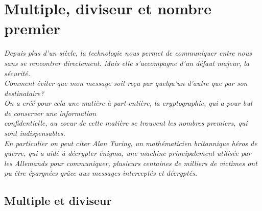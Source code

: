 \documentclass[french]{book}
\begin{document}
\begin{center}
\end{center}


\chapter{Multiple, diviseur et nombre premier}

\textit{Depuis plus d'un siècle, la technologie nous permet de communiquer entre nous sans se rencontrer directement. Mais elle s'accompagne d'un défaut majeur, la sécurité.
\\
 Comment éviter que mon message soit reçu par quelqu'un d'autre que par son destinataire? \\
On a créé pour cela une matière à part entière, la cryptographie, qui a pour but de conserver une information\\ 
\vspace{2mm} confidentielle, au coeur de cette matière se trouvent les nombres premiers, qui sont indispensables.\\
En particulier on peut citer Alan Turing, un mathématicien britannique héros de guerre, qui a aidé à décrypter énigma, une machine principalement utilisée par les Allemands pour communiquer, plusieurs centaines de milliers de victimes ont pu être épargnées grâce aux messages interceptés et décryptés.}  


\section{Multiple et diviseur}
\end{document}
